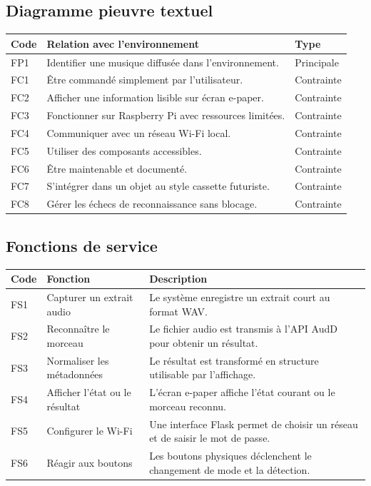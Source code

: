 \subsection{Diagramme pieuvre textuel}

\begin{longtable}{|p{1.8cm}|p{8.8cm}|p{2.5cm}|}
\hline
\textbf{Code} & \textbf{Relation avec l'environnement} & \textbf{Type} \\
\hline
FP1 & Identifier une musique diffusée dans l'environnement. & Principale \\
\hline
FC1 & Être commandé simplement par l'utilisateur. & Contrainte \\
\hline
FC2 & Afficher une information lisible sur écran e-paper. & Contrainte \\
\hline
FC3 & Fonctionner sur Raspberry Pi avec ressources limitées. & Contrainte \\
\hline
FC4 & Communiquer avec un réseau Wi-Fi local. & Contrainte \\
\hline
FC5 & Utiliser des composants accessibles. & Contrainte \\
\hline
FC6 & Être maintenable et documenté. & Contrainte \\
\hline
FC7 & S'intégrer dans un objet au style cassette futuriste. & Contrainte \\
\hline
FC8 & Gérer les échecs de reconnaissance sans blocage. & Contrainte \\
\hline
\end{longtable}

\subsection{Fonctions de service}

\begin{longtable}{|p{2cm}|p{5cm}|p{6cm}|}
\hline
\textbf{Code} & \textbf{Fonction} & \textbf{Description} \\
\hline
FS1 & Capturer un extrait audio &
Le système enregistre un extrait court au format WAV. \\
\hline
FS2 & Reconnaître le morceau &
Le fichier audio est transmis à l'API AudD pour obtenir un résultat. \\
\hline
FS3 & Normaliser les métadonnées &
Le résultat est transformé en structure utilisable par l'affichage. \\
\hline
FS4 & Afficher l'état ou le résultat &
L'écran e-paper affiche l'état courant ou le morceau reconnu. \\
\hline
FS5 & Configurer le Wi-Fi &
Une interface Flask permet de choisir un réseau et de saisir le mot de passe. \\
\hline
FS6 & Réagir aux boutons &
Les boutons physiques déclenchent le changement de mode et la détection. \\
\hline
\end{longtable}

